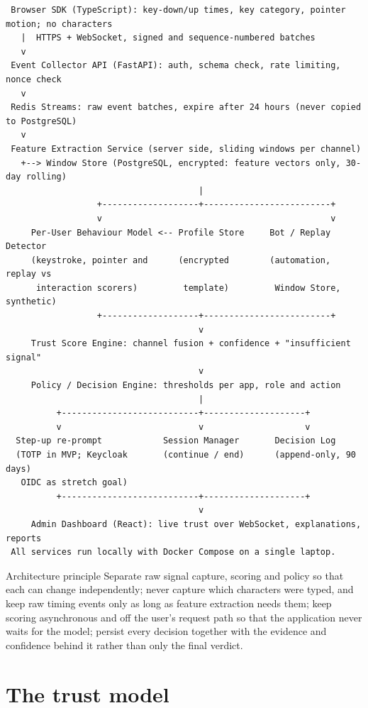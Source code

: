 \documentclass[10pt,letterpaper]{article}
\begin{document}
\begingroup
\fontsize{8.5}{9.3}\selectfont
\begin{verbatim}
 Browser SDK (TypeScript): key-down/up times, key category, pointer motion; no characters
   |  HTTPS + WebSocket, signed and sequence-numbered batches
   v
 Event Collector API (FastAPI): auth, schema check, rate limiting, nonce check
   v
 Redis Streams: raw event batches, expire after 24 hours (never copied to PostgreSQL)
   v
 Feature Extraction Service (server side, sliding windows per channel)
   +--> Window Store (PostgreSQL, encrypted: feature vectors only, 30-day rolling)
                                      |
                  +-------------------+-------------------------+
                  v                                             v
     Per-User Behaviour Model <-- Profile Store     Bot / Replay Detector
     (keystroke, pointer and      (encrypted        (automation, replay vs
      interaction scorers)         template)         Window Store, synthetic)
                  +-------------------+-------------------------+
                                      v
     Trust Score Engine: channel fusion + confidence + "insufficient signal"
                                      v
     Policy / Decision Engine: thresholds per app, role and action
                                      |
          +---------------------------+--------------------+
          v                           v                    v
  Step-up re-prompt            Session Manager       Decision Log
  (TOTP in MVP; Keycloak       (continue / end)      (append-only, 90 days)
   OIDC as stretch goal)
          +---------------------------+--------------------+
                                      v
     Admin Dashboard (React): live trust over WebSocket, explanations, reports
 All services run locally with Docker Compose on a single laptop.
\end{verbatim}
\endgroup

\begin{callout}{Architecture principle}
Separate raw signal capture, scoring and policy so that each can change independently; never capture which characters were typed, and keep raw timing events only as long as feature extraction needs them; keep scoring asynchronous and off the user's request path so that the application never waits for the model; persist every decision together with the evidence and confidence behind it rather than only the final verdict.
\end{callout}

\section{The trust model}
\end{document}
